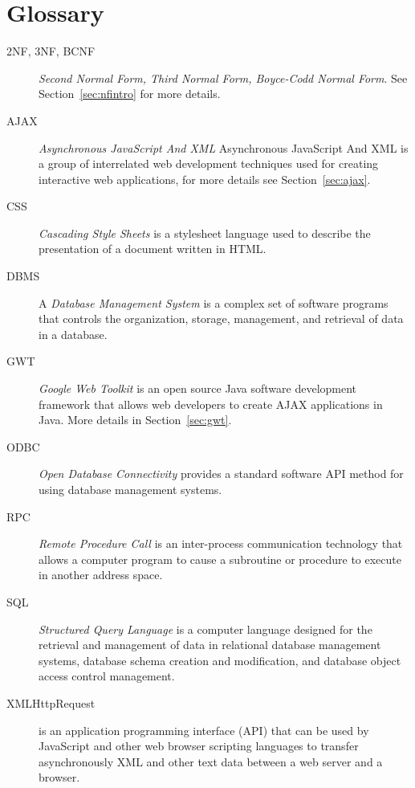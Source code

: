 \section{Glossary}
\begin{description}
	\item[2NF, 3NF, BCNF] \emph{Second Normal Form, Third Normal Form, Boyce-Codd Normal Form}. See Section~\ref{sec:nfintro} for more details.
	\item[AJAX] \emph{Asynchronous JavaScript And XML} Asynchronous JavaScript And XML is a group of interrelated web development techniques used for creating interactive web applications, for more details see Section~\ref{sec:ajax}.
	\item[CSS] \emph{Cascading Style Sheets} is a stylesheet language used to describe the presentation of a document written in HTML.
	\item[DBMS] A \emph{Database Management System} is a complex set of software programs that controls the organization, storage, management, and retrieval of data in a database.
	\item[GWT] \emph{Google Web Toolkit} is an open source Java software development framework that allows web developers to create AJAX applications in Java. More details in Section~\ref{sec:gwt}.
	\item[ODBC] \emph{Open Database Connectivity} provides a standard software API method for using database management systems.
	\item[RPC] \emph{Remote Procedure Call} is an inter-process communication technology that allows a computer program to cause a subroutine or procedure to execute in another address space.
	\item[SQL] \emph{Structured Query Language} is a computer language designed for the retrieval and management of data in relational database management systems, database schema creation and modification, and database object access control management.
	\item[XMLHttpRequest] is an application programming interface (API) that can be used by JavaScript and other web browser scripting languages to transfer asynchronously XML and other text data between a web server and a browser.
\end{description}

